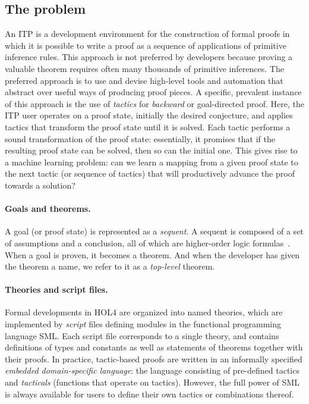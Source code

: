 \documentclass[runningheads,a4paper,draft]{svjour3}
\def\holfour{\textsf{HOL4}\xspace}
\def\sml{\textsf{SML}\xspace}
\begin{document}
\subsection{The problem}
An ITP is a development environment for the construction of formal proofs in
which it is possible to write a proof as a sequence of
applications of primitive inference rules. This approach is not preferred
by developers because proving a valuable theorem requires often many
thousands of primitive inferences.
The preferred approach is to use and devise high-level tools and
automation that abstract over useful ways of producing proof pieces.
A specific, prevalent instance of this approach is the use of \emph{tactics}
for \emph{backward} or goal-directed proof.
Here, the ITP user operates on a proof state, initially the desired conjecture,
and applies tactics that transform the proof state until it is solved.
Each tactic performs a sound transformation of the proof state: essentially, it
promises that if the resulting proof state can be solved, then so can the
initial one. This gives rise to a machine learning problem: can we learn a
mapping from a given proof state to the next tactic (or sequence of tactics)
that will productively advance the proof towards a solution?

\paragraph{Goals and theorems.}
A goal (or proof state) is represented as a \emph{sequent}.
A sequent is composed of a set of assumptions and a conclusion, all of which
are higher-order logic formulas~\cite{gordon01hol}.
When a goal is proven, it becomes a theorem.
And when the developer has given the theorem a name, we refer to it as a
\textit{top-level} theorem.

\paragraph{Theories and script files.}
Formal developments in \holfour are organized into named theories, which are
implemented by \emph{script} files defining modules in the
functional programming language \sml.
Each script file corresponds to a single theory, and contains definitions of
types and constants as well as statements of theorems together with their
proofs.
In practice, tactic-based proofs are written in an informally specified
\emph{embedded domain-specific language}: the language consisting of
pre-defined tactics and \emph{tacticals} (functions that operate on tactics).
However, the full power of \sml is always available for users to define their
own tactics or combinations thereof.
\end{document}
